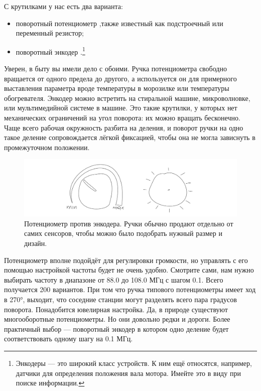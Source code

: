 С крутилками у нас есть два варианта:

\begin{itemize}
  \item поворотный потенциометр   ,\linebreak[2] также известный как подстроечный или переменный резистор;
  \item поворотный энкодер  .\footnote{Энкодеры — это широкий класс устройств. К ним ещё относятся, например, датчики для определения положения вала мотора. Имейте это в виду при поиске информации.}
\end{itemize}

Уверен, в быту вы имели дело с обоими. Ручка потенциометра свободно вращается от одного предела до другого, а используется он для примерного выставления параметра вроде температуры в морозилке или температуры обогревателя. Энкодер можно встретить на стиральной машине, микроволновке, или мультимедийной системе в машине. Это такие крутилки, у которых нет механических ограничений на угол поворота: их можно вращать бесконечно. Чаще всего рабочая окружность разбита на деления, и поворот ручки на одно такое деление сопровождается лёгкой фиксацией, чтобы она не могла зависнуть в промежуточном положении.

\begin{figure}
  \centering
  \includegraphics{sketches/pot-vs-encoder}
  \caption{Потенциометр против энкодера. Ручки обычно продают отдельно от самих сенсоров, чтобы можно было подобрать нужный размер и дизайн.}
\end{figure}

Потенциометр вполне подойдёт для регулировки громкости, но управлять с его помощью настройкой частоты будет не очень удобно. Смотрите сами, нам нужно выбирать частоту в диапазоне от 88.0 до 108.0 МГц с шагом 0.1. Всего получается 200 вариантов. При том что ручка типового потенциометры имеет ход в 270°, выходит, что соседние станции могут разделять всего пара градусов поворота. Понадобится ювелирная настройка. Да, в природе существуют многооборотные потенциометры. Но они довольно редки и дороги. Более практичный выбор — поворотный энкодер в котором одно деление будет соответствовать одному шагу на 0.1 МГц.

